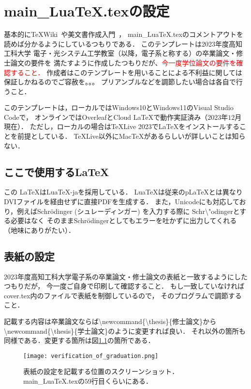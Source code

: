 \chapter{main\_LuaTeX.texの設定}
基本的に\TeX Wiki~\cite{luatex}や美文書作成入門~\cite{美文書作成入門}，
main\_LuaTeX.texのコメントアウトを読めば分かるようにしているつもりである．
このテンプレートは2023年度高知工科大学 電子・光システム工学教室（以降，電子系と称する）の卒業論文・修士論文の要件を
満たすように作成したつもりだが、\textcolor{red}{今一度学位論文の要件を確認すること．}
作成者はこのテンプレートを用いることによる不利益に関しては保証しかねるのでご容赦を。。。
プリアンブルなどを調節したい場合は各自で行うこと．

このテンプレートは，ローカルではWindows10とWindows11のVisual Studio Codeで，
オンラインではOverleafとCloud LaTeXで動作実証済み（$2023$年$12$月現在）．
ただし，ローカルの場合は\TeX Live 2023で\LaTeX をインストールすることを前提としている．
\TeX Live以外にMac\TeX があるらしいが詳しいことは知らない．

\section{ここで使用する\LaTeX}
この \LaTeX はLua\TeX -jaを採用している．
Lua\TeX は従来のp\LaTeX とは異なりDVIファイルを経由せずに直接PDFを生成する．
また，Unicodeにも対応しており，例えばSchr\"odinger (シュレーディンガー) を入力する際に
Schr\textbackslash "odingerとする必要はなく
そのままSchrödingerとしてもエラーを吐かずに出力してくれる（地味にありがたい）．

\section{表紙の設定}
2023年度高知工科大学電子系の卒業論文・修士論文の表紙と一致するようにしたつもりだが，
今一度ご自身で印刷して確認すること．
もし一致していなければcover.tex内のファイルで表紙を制御しているので，
そのプログラムで調節すること．

記載する内容は卒業論文ならば\textbackslash newcommand\{\textbackslash thesis\}\{修士論文\}から
\textbackslash newcommand\{\textbackslash thesis\}\{学士論文\}のように変更すれば良い．
それ以外の箇所も同様である．変更する箇所は図\ref{fig:cover}の箇所である．

\begin{figure}[h]
  \centering
  \texttt{[image: verification\_of\_graduation.png]}
  \caption{表紙の設定を記載する位置のスクリーンショット．main\_LuaTeX.texの$59$行目くらいにある．}
  \label{fig:cover}
\end{figure}

